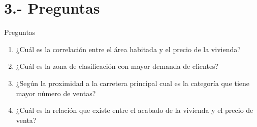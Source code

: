 \documentclass[aspectratio=169]{beamer}
\begin{document}
    \section{3.- Preguntas}
	    \begin{frame}{Preguntas}
	    	\begin{enumerate}
	    		\item ¿Cuál es la correlación entre el área habitada y el precio de la vivienda?
	    		\item ¿Cuál es la zona de clasificación con mayor demanda de clientes?
	    		\item ¿Según la proximidad a la carretera principal cual es la categoría que tiene mayor número de ventas?
	    		\item ¿Cuál es la relación que existe entre el acabado de la vivienda y el precio de venta?
	    	\end{enumerate}
	    \end{frame}          
\end{document}
